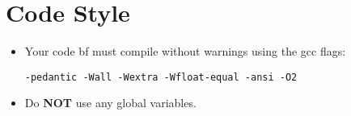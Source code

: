 \section*{Code Style}
\begin{itemize}
\item Your code {bf must} compile without warnings using the gcc flags:
\begin{verbatim}
-pedantic -Wall -Wextra -Wfloat-equal -ansi -O2
\end{verbatim}
\item Do {\bf NOT} use any global variables.
\end{itemize}
